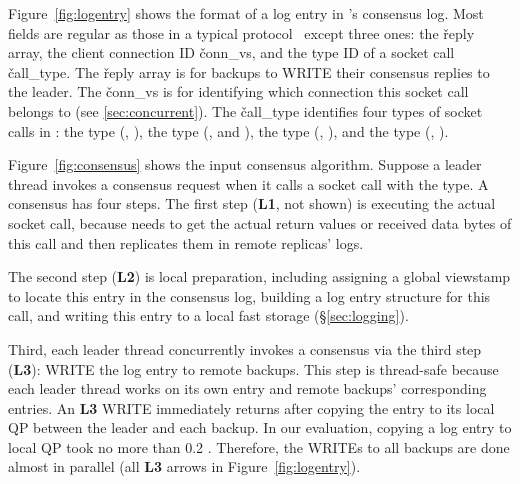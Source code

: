 Figure~\ref{fig:logentry} shows the format of a log entry in \xxx's consensus 
log. Most fields are regular as those in a typical \paxos 
protocol~\cite{paxos:practical} except three ones: the \v{reply} array, the 
client connection ID \v{conn\_vs}, and the type ID of a socket call 
\v{call\_type}. The \v{reply} array is for backups to WRITE their consensus 
replies to the leader. The \v{conn\_vs} is for identifying which connection this 
socket call belongs to (see \ref{sec:concurrent}). The \v{call\_type} 
identifies four types of socket calls in \xxx: the \accept type (\eg, \accept), 
the \recv type (\eg, \recv and \myread), the \send type (\eg, \send), and the 
\close type (\eg, \close).

Figure~\ref{fig:consensus} shows the input consensus algorithm. Suppose a 
leader thread invokes a consensus request when it calls a socket call with the 
\recv type. A consensus has four steps. The first step 
(\textbf{L1}, not shown) is executing the actual socket call, because \xxx 
needs to get the actual return values or received data bytes of this call and 
then replicates them in remote replicas' logs.

The second step (\textbf{L2}) is local preparation, including assigning a 
global viewstamp to locate this entry in the consensus log, building a log 
entry structure for this call, and writing this entry to a local fast
storage (\S\ref{sec:logging}). 

Third, each leader thread concurrently invokes a consensus via the third step 
(\textbf{L3}): WRITE the log entry to remote backups. This step is thread-safe 
because each leader thread works on its own entry and remote backups' 
corresponding entries. An \textbf{L3} WRITE immediately returns after 
copying the entry to its local QP between the leader and each backup. In our 
evaluation, copying a log entry to local QP took 
no more than 0.2 \us. Therefore, the WRITEs to all backups are done almost in 
parallel (all \textbf{L3} arrows in Figure~\ref{fig:logentry}).



